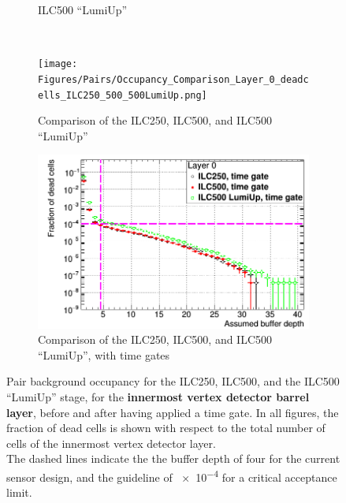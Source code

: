 \begin{figure}
\begin{subfigure}[t]{0.49\textwidth}
   \caption{ILC500 ``LumiUp''}
   \end{subfigure}
      \hfill
   \begin{minipage}{0.49\textwidth}
   \hfill
    \end{minipage}\\
  \begin{subfigure}[t]{0.49\textwidth}
   \centering
    \texttt{[image: Figures/Pairs/Occupancy\_Comparison\_Layer\_0\_deadcells\_ILC250\_500\_500LumiUp.png]}
   \caption{Comparison of the ILC250, ILC500, and ILC500 ``LumiUp''}
   \end{subfigure}
   \hfill
    \begin{subfigure}[t]{0.49\textwidth}
   \centering
    \includegraphics[width=\textwidth]{Figures/Pairs/Occupancy_Comparison_Layer_0_deadcells_ILC250_500_500LumiUp_TimeGate.png}
   \caption{Comparison of the ILC250, ILC500, and ILC500 ``LumiUp'', with time gates}
   \end{subfigure}
   \caption[Pair background occupancy in the \sid vertex detector for the ILC250, ILC500 and the ILC500 ``Lumi Up'' with time gates]{Pair background occupancy for the ILC250, ILC500, and the ILC500 ``LumiUp'' stage, for the \textbf{innermost \sid vertex detector barrel layer}, before and after having applied a time gate.
   In all figures, the fraction of dead cells is shown with respect to the total number of cells of the innermost vertex detector layer.
   \\The dashed lines indicate the the buffer depth of four for the current sensor design, and the guideline of \num{e-4} for a critical acceptance limit.
   }
   \label{fig:PairBkg:Timegate_Occupancy}
 \end{figure}
 
